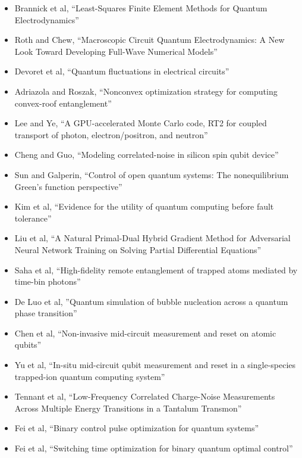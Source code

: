 \documentclass[]{article}
\begin{document}
\begin{itemize}
\item Brannick et al, ``Least-Squares Finite Element Methods for Quantum Electrodynamics''
\item Roth and Chew, ``Macroscopic Circuit Quantum Electrodynamics: A New Look Toward Developing Full-Wave Numerical Models''
\item Devoret et al, ``Quantum fluctuations in electrical circuits''
\item Adriazola and Roszak, ``Nonconvex optimization strategy for computing convex-roof entanglement''
\item Lee and Ye\cite{lee2024gpu}, ``A GPU-accelerated Monte Carlo code, RT2 for coupled transport of photon, electron/positron, and neutron''
\item Cheng and Guo\cite{cheng2025modeling}, ``Modeling correlated-noise in silicon spin qubit device''
\item Sun and Galperin\cite{sun2025control}, ``Control of open quantum systems: The nonequilibrium Green’s function perspective''
\item Kim et al\cite{kim2023evidence}, ``Evidence for the utility of quantum computing before fault tolerance''
\item Liu et al\cite{liu2024natural}, ``A Natural Primal-Dual Hybrid Gradient Method for Adversarial Neural Network Training on Solving Partial Differential Equations''
\item Saha et al\cite{saha2025high}, ``High-fidelity remote entanglement of trapped atoms mediated by time-bin photons''
\item De Luo et al\cite{luo2025quantumsimulationbubblenucleation},
''Quantum simulation of bubble nucleation across a quantum phase transition''
\item Chen et al\cite{chen2025non}, 
``Non-invasive mid-circuit measurement and reset on atomic qubits''
\item Yu et al\cite{yu2025situ},
``In-situ mid-circuit qubit measurement and reset in a single-species trapped-ion quantum computing system''
\item Tennant et al\cite{PRXQuantum.3.030307}, 
``Low-Frequency Correlated Charge-Noise Measurements Across Multiple Energy Transitions in a Tantalum Transmon''
\item Fei et al\cite{fei2023binary},
 ``Binary control pulse optimization for quantum systems''
\item Fei et al\cite{fei2025switching},
 ``Switching time optimization for binary quantum optimal control''

\end{itemize}
\end{document}
